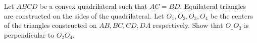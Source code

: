 Let $ABCD$ be a convex quadrilateral such that $AC = BD$. Equilateral triangles are constructed on the sides of the quadrilateral. Let $O_1, O_2, O_3, O_4$ be the centers of the triangles constructed on $AB, BC, CD, DA$ respectively. Show that $O_1 O_3$ is perpendicular to $O_2 O_4$.
